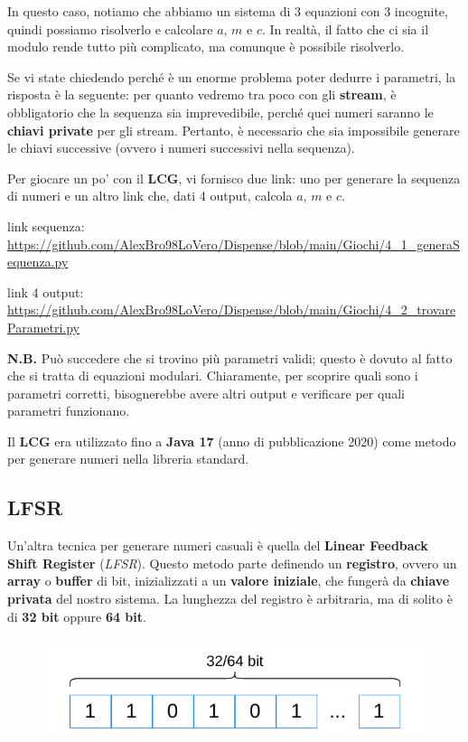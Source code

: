\documentclass{report}
\begin{document}
In questo caso, notiamo che abbiamo un sistema di 3 equazioni con 3 incognite, quindi possiamo risolverlo e calcolare $a$, $m$ e $c$.  
In realtà, il fatto che ci sia il modulo rende tutto più complicato, ma comunque è possibile risolverlo.


Se vi state chiedendo perché è un enorme problema poter dedurre i parametri, la risposta è la seguente: per quanto vedremo tra poco con gli \textbf{stream}, è obbligatorio che la sequenza sia imprevedibile, perché quei numeri saranno le \textbf{chiavi private} per gli stream.  
Pertanto, è necessario che sia impossibile generare le chiavi successive (ovvero i numeri successivi nella sequenza).


Per giocare un po' con il \textbf{LCG}, vi fornisco due link: uno per generare la sequenza di numeri e un altro link che, dati 4 output, calcola $a$, $m$ e $c$.


\vspace{0.2cm}
link sequenza: \url{https://github.com/AlexBro98LoVero/Dispense/blob/main/Giochi/4_1_generaSequenza.py}

link 4 output: \url{https://github.com/AlexBro98LoVero/Dispense/blob/main/Giochi/4_2_trovareParametri.py}
\vspace{0.2cm}

\textbf{N.B.} Può succedere che si trovino più parametri validi; questo è dovuto al fatto che si tratta di equazioni modulari.  
Chiaramente, per scoprire quali sono i parametri corretti, bisognerebbe avere altri output e verificare per quali parametri funzionano.


Il \textbf{LCG} era utilizzato fino a \textbf{Java 17} (anno di pubblicazione 2020) come metodo per generare numeri nella libreria standard.

\newpage

\subsection{LFSR}

Un'altra tecnica per generare numeri casuali è quella del \textbf{Linear Feedback Shift Register} (\textit{LFSR}).  
Questo metodo parte definendo un \textbf{registro}, ovvero un \textbf{array} o \textbf{buffer} di bit, inizializzati a un \textbf{valore iniziale}, che fungerà da \textbf{chiave privata} del nostro sistema.  
La lunghezza del registro è arbitraria, ma di solito è di \textbf{32 bit} oppure \textbf{64 bit}.


\begin{figure}[h]
    \centering
    \includegraphics[width=0.7\linewidth]{logos/4_3cripto.pdf}
\end{figure}
\end{document}
